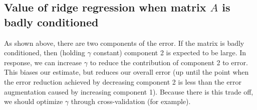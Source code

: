 \documentclass[paper=a4, fontsize=11pt]{scrartcl} %
\numberwithin{equation}{section} %
\numberwithin{figure}{section} %
\numberwithin{table}{section} %
\begin{document}
\subsection{Value of ridge regression when matrix $A$ is badly conditioned}

As shown above, there are two components of the error. If the matrix is badly conditioned, then (holding $\gamma$ constant) component 2 is expected to be large. In response, we can increase $\gamma$ to reduce the contribution of component 2 to error. This biases our estimate, but reduces our overall error (up until the point when the error reduction achieved by decreasing component 2 is less than the error augmentation caused by increasing component 1). Because there is this trade off, we should optimize $\gamma$ through cross-validation (for example).
\end{document}
